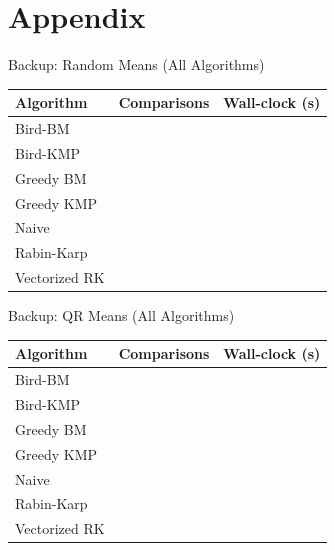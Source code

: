 \appendix
\section{Appendix}

\begin{frame}{Backup: Random Means (All Algorithms)}
\scriptsize
\centering
\begin{tabular}{lrr}
\toprule
\textbf{Algorithm} & \textbf{Comparisons} & \textbf{Wall-clock (s)} \\
\midrule
Bird-BM & \RandomCompBirdBM{} & \RandomTimeBirdBM{} \\
Bird-KMP & \RandomCompBirdKMP{} & \RandomTimeBirdKMP{} \\
Greedy BM & \RandomCompGreedyBM{} & \RandomTimeGreedyBM{} \\
Greedy KMP & \RandomCompGreedyKMP{} & \RandomTimeGreedyKMP{} \\
Naive & \RandomCompNaive{} & \RandomTimeNaive{} \\
Rabin-Karp & \RandomCompRabinKarp{} & \RandomTimeRabinKarp{} \\
Vectorized RK & \RandomCompVectorizedRK{} & \RandomTimeVectorizedRK{} \\
\bottomrule
\end{tabular}
\end{frame}

\begin{frame}{Backup: QR Means (All Algorithms)}
\scriptsize
\centering
\begin{tabular}{lrr}
\toprule
\textbf{Algorithm} & \textbf{Comparisons} & \textbf{Wall-clock (s)} \\
\midrule
Bird-BM & \QrCompBirdBM{} & \QrTimeBirdBM{} \\
Bird-KMP & \QrCompBirdKMP{} & \QrTimeBirdKMP{} \\
Greedy BM & \QrCompGreedyBM{} & \QrTimeGreedyBM{} \\
Greedy KMP & \QrCompGreedyKMP{} & \QrTimeGreedyKMP{} \\
Naive & \QrCompNaive{} & \QrTimeNaive{} \\
Rabin-Karp & \QrCompRabinKarp{} & \QrTimeRabinKarp{} \\
Vectorized RK & \QrCompVectorizedRK{} & \QrTimeVectorizedRK{} \\
\bottomrule
\end{tabular}
\end{frame}

